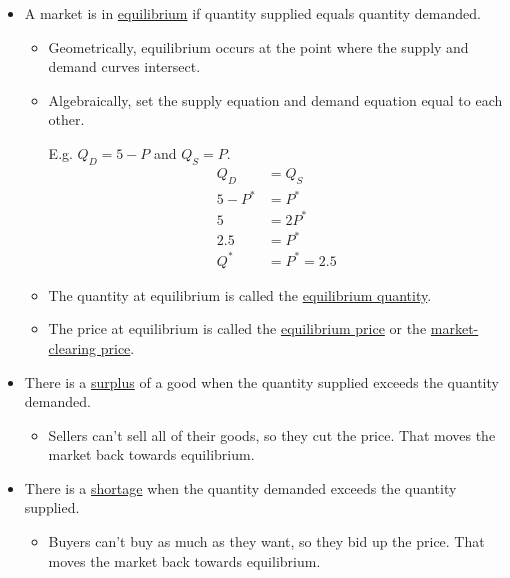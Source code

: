	\begin{itemize}

	\item A market is in \underline{equilibrium} if quantity supplied equals quantity demanded.
	
		\begin{itemize}
		
		\item Geometrically, equilibrium occurs at the point where the supply and demand curves intersect.
		
		\item Algebraically, set the supply equation and demand equation equal to each other. \newline
		
			E.g. $Q_D = 5 - P$ and $Q_S = P$.
				\begin{align*}
				Q_D &= Q_S \\
				5 - P^* &= P^* \\
				5 &= 2P^* \\
				2.5 &= P^* \\
				Q^* &= P^* = 2.5
				\end{align*}
	
		\item The quantity at equilibrium is called the \underline{equilibrium quantity}.
	
		\item The price at equilibrium is called the \underline{equilibrium price} or the \underline{market-clearing price}.
	
		\end{itemize}
	
	\item There is a \underline{surplus} of a good when the quantity supplied exceeds the quantity demanded.
	
		\begin{itemize}
		
		\item Sellers can't sell all of their goods, so they cut the price. That moves the market back towards equilibrium.
		
		\end{itemize}
		
	\item There is a \underline{shortage} when the quantity demanded exceeds the quantity supplied.
	
		\begin{itemize}
		
		\item Buyers can't buy as much as they want, so they bid up the price. That moves the market back towards equilibrium. 
		

\end{itemize}
\end{itemize}
